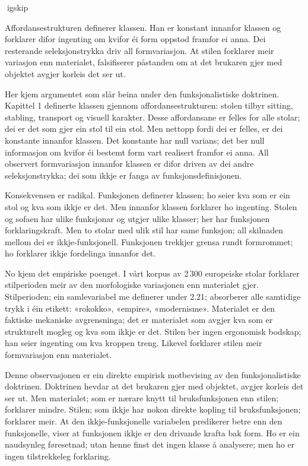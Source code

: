 igskip

Affordansestrukturen definerer klassen. Han er konstant innanfor klassen og forklarer difor ingenting om kvifor éi form oppstod framfor ei anna. Dei resterande seleksjonstrykka driv all formvariasjon. At stilen forklarer meir variasjon enn materialet, falsifiserer påstanden om at det brukaren gjer med objektet avgjer korleis det ser ut.

Her kjem argumentet som slår beina under den funksjonalistiske doktrinen. Kapittel 1 definerte klassen gjennom affordansestrukturen: stolen tilbyr sitting, stabling, transport og visuell karakter. Desse affordansane er felles for alle stolar; dei er det som gjer ein stol til ein stol. Men nettopp fordi dei er felles, er dei konstante innanfor klassen. Det konstante har null varians; det ber null informasjon om kvifor éi bestemt form vart realisert framfor ei anna. All observert formvariasjon innanfor klassen er difor driven av dei andre seleksjonstrykka; dei som ikkje er fanga av funksjonsdefinisjonen.

Konsekvensen er radikal. Funksjonen definerer klassen; ho seier kva som er ein stol og kva som ikkje er det. Men innanfor klassen forklarer ho ingenting. Stolen og sofaen har ulike funksjonar og utgjer ulike klasser; her har funksjonen forklaringskraft. Men to stolar med ulik stil har same funksjon; all skilnaden mellom dei er ikkje-funksjonell. Funksjonen trekkjer grensa rundt formrommet; ho forklarer ikkje fordelinga innanfor det.

No kjem det empiriske poenget. I vårt korpus av 2\,300 europeiske stolar forklarer stilperioden meir av den morfologiske variasjonen enn materialet gjer. Stilperioden; ein samlevariabel me definerer under 2.21; absorberer alle samtidige trykk i éin etikett: «rokokko», «empire», «modernisme». Materialet er den faktiske mekaniske avgrensninga; det er materialet som avgjer kva som er strukturelt mogleg og kva som ikkje er det. Stilen ber ingen ergonomisk bodskap; han seier ingenting om kva kroppen treng. Likevel forklarer stilen meir formvariasjon enn materialet.

Denne observasjonen er ein direkte empirisk motbevising av den funksjonalistiske doktrinen. Doktrinen hevdar at det brukaren gjer med objektet, avgjer korleis det ser ut. Men materialet; som er nærare knytt til bruksfunksjonen enn stilen; forklarer mindre. Stilen; som ikkje har nokon direkte kopling til bruksfunksjonen; forklarer meir. At den ikkje-funksjonelle variabelen predikerer betre enn den funksjonelle, viser at funksjonen ikkje er den drivande krafta bak form. Ho er ein naudsynleg føresetnad; utan henne finst det ingen klasse å analysere; men ho er ingen tilstrekkeleg forklaring.

